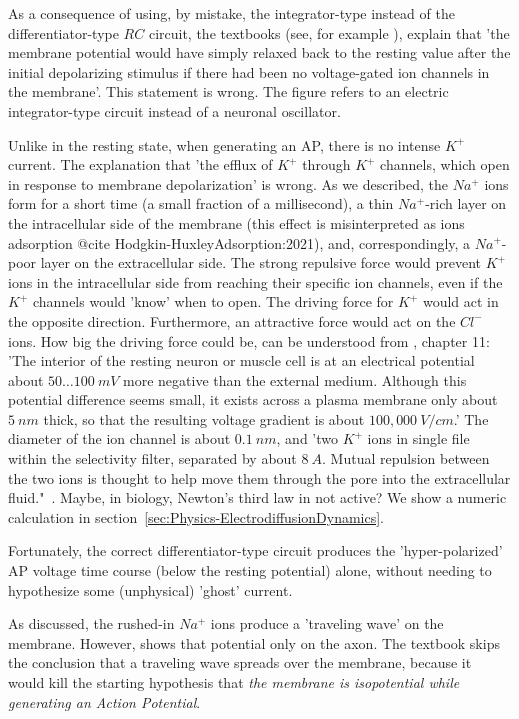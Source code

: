 As a consequence of using, by mistake, the integrator-type instead of the differentiator-type $RC$ circuit,
the textbooks (see, for example \cite{MolecularBiology:2002}), explain that 'the membrane potential would have simply relaxed back
to the resting value after the initial depolarizing stimulus if there had been
no voltage-gated ion channels in the membrane'. This statement is wrong.
The figure refers to an electric integrator-type circuit instead of a neuronal oscillator.

Unlike in the resting state, when generating an 
AP, there is no intense $K^+$ current. The explanation that
'the efflux of $K^+$ through $K^+$ channels,
which open in response to membrane depolarization' \cite{MolecularBiology:2002}
is wrong. As we described, the $Na^+$ ions form for a
short time (a small fraction of a millisecond), a thin $Na^+$-rich layer on the
intracellular side of the membrane (this effect is misinterpreted
as ions adsorption @cite Hodgkin-HuxleyAdsorption:2021), 
and, correspondingly, a $Na^+$-poor layer on the extracellular side.
The strong repulsive force would prevent
$K^+$ ions in the intracellular side from reaching their specific ion channels,
even if the $K^+$ channels would 'know' when to open.
The driving force for $K^+$ would act in the opposite direction.
Furthermore, an attractive force would act on the $Cl^-$ ions.
How big the driving force could be, can be understood from \cite{MolecularBiology:2002}, chapter 11:
'The interior of the resting neuron or muscle cell is at an electrical potential
about $50\dots 100\ mV$ more negative than the external medium.
Although this potential difference seems small, it exists across a plasma membrane
only about $5\ nm$ thick, so that the resulting voltage gradient is about $100,000\ V/cm$.'
The diameter of the ion channel is about $0.1\ nm$, and
'two $K^+$ ions in single file within the selectivity filter,
separated by about $8\ A$.
Mutual repulsion between the two ions is thought to help move them through the pore
into the extracellular fluid."~\cite{MolecularBiology:2002}. Maybe, in biology, Newton's third law in not active?
We show a numeric calculation in section~\ref{sec:Physics-ElectrodiffusionDynamics}.

Fortunately, the correct differentiator-type
circuit produces the 'hyper-polarized' 
AP voltage time course
(below the resting potential) alone, without needing to hypothesize
some (unphysical) 'ghost' current.

As discussed,
the rushed-in $Na^+$ ions
produce a 'traveling wave' on the membrane. However,  \cite{MolecularBiology:2002} shows that potential only on the axon.
The textbook skips the conclusion that a traveling wave spreads over the membrane,
because it would kill the starting hypothesis that
\textit{the membrane is isopotential while generating an Action Potential}.

